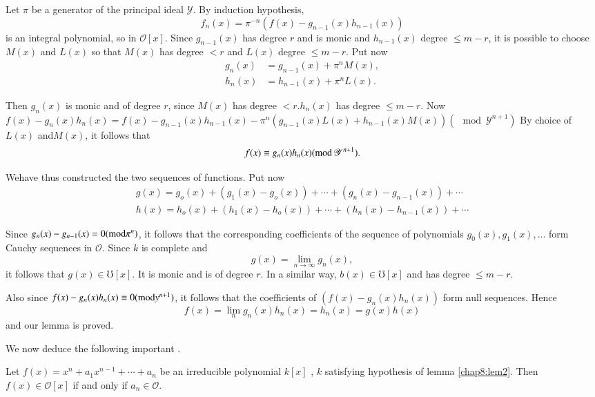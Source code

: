 Let $\pi$ be a generator of the principal ideal $\mathscr{Y}$. By
induction hypothesis,  
$$
f_n (x) = \pi^{ -n }(f(x) - g_{ n-1} (x) h_{n-1}(x))
$$
is an integral polynomial, so in $\mathscr{O} [x]$. Since $g_{n -1}
(x)$ has degree $r$ and is monic and $h_{ n-1}(x)$ degree $\leq m - r
$, it is possible to choose $M(x)$ and $L(x)$ so that $M(x)$ has
degree $< r$ and $L(x)$ degree $\leq m - r$. Put now  
\begin{align*}
g_n (x) & = g_{n - 1} (x) + \pi ^n M(x), \\
h_n (x) & = h_{n - 1} (x) + \pi ^n L(x).
\end{align*}

Then $g_n (x)$ is monic and of degree $r$, since $M(x)$ has degree $ <
r. h_n (x)$ has degree $\leq m - r$. Now $f(x) - g_n(x) h_n (x) = f(x)
- g_{ n-1}(x) h_{ n-1}(x) - \pi^n (g_{ n-1}(x) L(x) + h_{ n-1}(x) M(x) )
(\mod \mathscr{Y}^{ n+1})$ 
By choice of $L(x)$ and\break $M(x)$, it follows that 
$$
f (x) \equiv g_n (x) h_n (x) ({\rm mod}\, \mathscr{Y}^{ n+1}). 
$$

We\pageoriginale have thus constructed the two sequences of
functions. Put now  
\begin{align*}
g(x) = g_o (x) + (g_1 (x) - g_o (x) )+ \cdots + (g_n (x) - g_{
  n-1}(x)) + \cdots \\ 
h(x) = h_o (x) + (h_1 (x) - h_o (x) )+ \cdots + (h_n (x) - h_{
  n-1}(x)) + \cdots 
\end{align*}

 Since $g_n (x) - g_{ n-1}(x) = 0 ({\rm mod} \pi ^n)$, it follows that the
 corresponding coefficients of the sequence of polynomials $g_0 (x),
 g_1 (x) , \ldots $ form Cauchy sequences in $\mathscr{O}$. Since $k$
 is complete and  
$$
g(x) = \lim_{ n \to \infty } g_n (x), 
$$
 it follows that $g(x) \in \mho [x]$. It is monic and is of
 degree $r$. In a similar way, $b(x) \in \mho [x]$ and has
 degree $\leq m -r $.  


Also since $f(x) - g_n (x) h_n (x) \equiv 0 ({\rm mod} y^{n +1})$, it
follows that the coefficients of $(f(x) - g_ n (x) h_n (x))$ form
null sequences. Hence 
$$
f(x) = \lim _ n g_n (x) h_n (x) = h_n (x) = g(x) h(x)
$$
and our lemma is proved. 

We now deduce the following important . 

\begin{lem}\label{chap8:lem3} %
 Let $f(x) = x^n + a_1 x^{ n -1} + \cdots + a_n$ be an
  irreducible polynomial $k[x]$ , $k$ satisfying hypothesis of lemma
  \ref{chap8:lem2}. Then $f(x) \in \mathscr{O} [x] $ if and only if $ a_n \in
  \mathscr{O} $.  
\end{lem}

